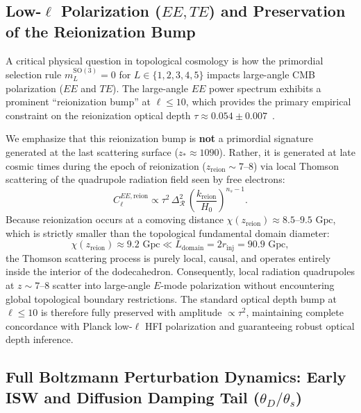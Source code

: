 \documentclass[11pt,a4paper]{article}
\theoremstyle{definition}
\newcommand{\SO}{\mathrm{SO}}
\begin{document}
\subsection{Low-$\ell$ Polarization ($EE, TE$) and Preservation of the Reionization Bump}

A critical physical question in topological cosmology is how the primordial selection rule $m_L^{\SO(3)} = 0$ for $L \in \{1, 2, 3, 4, 5\}$ impacts large-angle CMB polarization ($EE$ and $TE$). The large-angle $EE$ power spectrum exhibits a prominent ``reionization bump'' at $\ell \le 10$, which provides the primary empirical constraint on the reionization optical depth $\tau \approx 0.054 \pm 0.007$~\cite{Planck2018Params}.

We emphasize that this reionization bump is \textbf{not} a primordial signature generated at the last scattering surface ($z_* \approx 1090$). Rather, it is generated at late cosmic times during the epoch of reionization ($z_{\mathrm{reion}} \sim 7\text{--}8$) via local Thomson scattering of the quadrupole radiation field seen by free electrons:
\begin{equation}
C_\ell^{EE,\mathrm{reion}} \propto \tau^2 \, \Delta_{\mathcal{R}}^2 \, \left(\frac{k_{\mathrm{reion}}}{H_0}\right)^{n_s - 1}.
\end{equation}
Because reionization occurs at a comoving distance $\chi(z_{\mathrm{reion}}) \approx 8.5\text{--}9.5\text{ Gpc}$, which is strictly smaller than the topological fundamental domain diameter:
\begin{equation}
\chi(z_{\mathrm{reion}}) \approx 9.2\text{ Gpc} \ll L_{\mathrm{domain}} = 2 r_{\mathrm{inj}} = 90.9\text{ Gpc},
\end{equation}
the Thomson scattering process is purely local, causal, and operates entirely inside the interior of the dodecahedron. Consequently, local radiation quadrupoles at $z \sim 7\text{--}8$ scatter into large-angle $E$-mode polarization without encountering global topological boundary restrictions. The standard optical depth bump at $\ell \le 10$ is therefore fully preserved with amplitude $\propto \tau^2$, maintaining complete concordance with Planck low-$\ell$ HFI polarization and guaranteeing robust optical depth inference.

\subsection{Full Boltzmann Perturbation Dynamics: Early ISW and Diffusion Damping Tail ($\theta_D / \theta_s$)}
\end{document}
